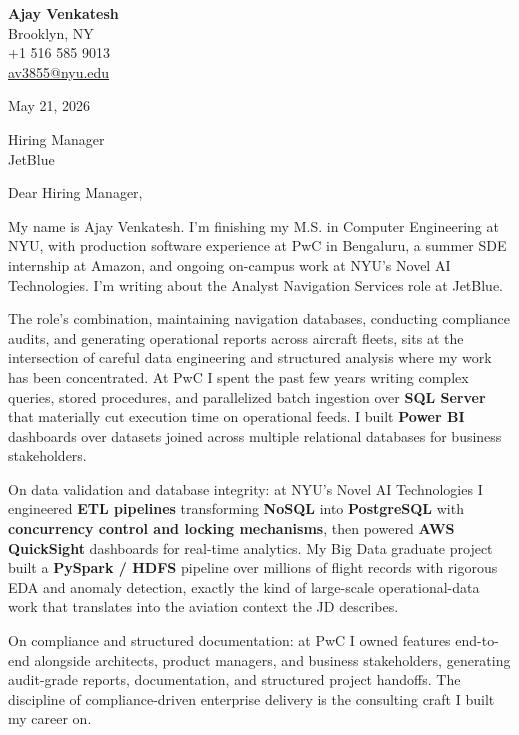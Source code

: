 \documentclass[letterpaper,11pt]{article}
\begin{document}
\begin{flushleft}
\textbf{\large Ajay Venkatesh} \\
Brooklyn, NY \\
+1 516 585 9013 \\
\href{mailto:av3855@nyu.edu}{av3855@nyu.edu}
\end{flushleft}
\vspace{10pt}
May 21, 2026
\vspace{6pt}

Hiring Manager \\
JetBlue

\vspace{10pt}

Dear Hiring Manager,

My name is Ajay Venkatesh. I'm finishing my M.S. in Computer Engineering at NYU, with production software experience at PwC in Bengaluru, a summer SDE internship at Amazon, and ongoing on-campus work at NYU's Novel AI Technologies. I'm writing about the Analyst Navigation Services role at JetBlue.

The role's combination, maintaining navigation databases, conducting compliance audits, and generating operational reports across aircraft fleets, sits at the intersection of careful data engineering and structured analysis where my work has been concentrated. At PwC I spent the past few years writing complex queries, stored procedures, and parallelized batch ingestion over \textbf{SQL Server} that materially cut execution time on operational feeds. I built \textbf{Power BI} dashboards over datasets joined across multiple relational databases for business stakeholders.

On data validation and database integrity: at NYU's Novel AI Technologies I engineered \textbf{ETL pipelines} transforming \textbf{NoSQL} into \textbf{PostgreSQL} with \textbf{concurrency control and locking mechanisms}, then powered \textbf{AWS QuickSight} dashboards for real-time analytics. My Big Data graduate project built a \textbf{PySpark / HDFS} pipeline over millions of flight records with rigorous EDA and anomaly detection, exactly the kind of large-scale operational-data work that translates into the aviation context the JD describes.

On compliance and structured documentation: at PwC I owned features end-to-end alongside architects, product managers, and business stakeholders, generating audit-grade reports, documentation, and structured project handoffs. The discipline of compliance-driven enterprise delivery is the consulting craft I built my career on.
\end{document}

